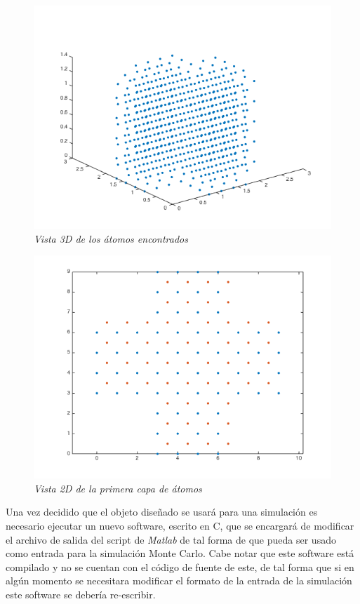 \begin{figure}[H]
  \centering
  \includegraphics[scale=.6]{images/procesoActualMatlab1}
  \caption{\em Vista 3D de los átomos encontrados}
\end{figure}

\begin{figure}[H]
  \centering
  \includegraphics[scale=.6]{images/procesoActualMatlab2}
  \caption{\em Vista 2D de la primera capa de átomos}
\end{figure}

Una vez decidido que el objeto diseñado se usará para una simulación es necesario ejecutar un nuevo software, escrito en C, que se encargará de modificar el archivo de salida del script de \emph{Matlab} de tal forma de que pueda ser usado como entrada para la simulación Monte Carlo. Cabe notar que este software está compilado y no se cuentan con el código de fuente de este, de tal forma que si en algún momento se necesitara modificar el formato de la entrada de la simulación este software se debería re-escribir.

